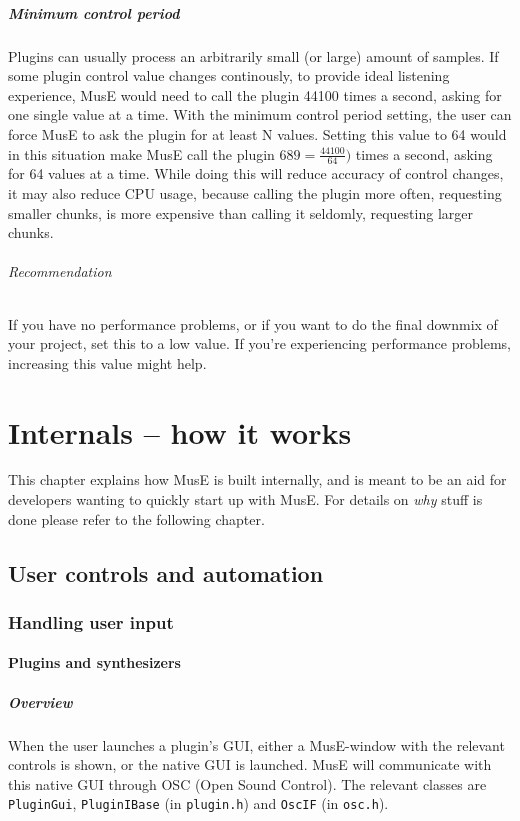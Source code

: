 \documentclass[a4paper]{report}
\newcommand{\sym}[1]{\texttt{#1}}
\newcommand{\file}[1]{\texttt{#1}}
\begin{document}
\paragraph{Minimum control period}
Plugins can usually process an arbitrarily small (or large) amount of
samples. If some plugin control value changes continously, to provide
ideal listening experience, MusE would need to call the plugin 44100
times a second, asking for one single value at a time. With the minimum
control period setting, the user can force MusE to ask the plugin for
at least N values. Setting this value to 64 would in this situation
make MusE call the plugin $689 = \frac{44100}{64})$ times a second,
asking for 64 values at a time. While doing this will reduce accuracy
of control changes, it may also reduce CPU usage, because calling
the plugin more often, requesting smaller chunks, is more expensive
than calling it seldomly, requesting larger chunks.
\subparagraph{Recommendation}
If you have no performance problems, or if you want to do the final
downmix of your project, set this to a low value. If you're experiencing
performance problems, increasing this value might help.






\chapter{Internals -- how it works}
This chapter explains how MusE is built internally, and is meant
to be an aid for developers wanting to quickly start up with MusE.
For details on \emph{why} stuff is done please refer to the following
chapter.
\section{User controls and automation}
\subsection{Handling user input}
\subsubsection{Plugins and synthesizers}
\paragraph{Overview}
When the user launches a plugin's GUI, either a MusE-window with
the relevant controls is shown, or the native GUI is launched. MusE
will communicate with this native GUI through OSC (Open Sound Control).
The relevant classes are \sym{PluginGui}, \sym{PluginIBase}
(in \file{plugin.h}) and \sym{OscIF} (in \sym{osc.h}).
\end{document}
